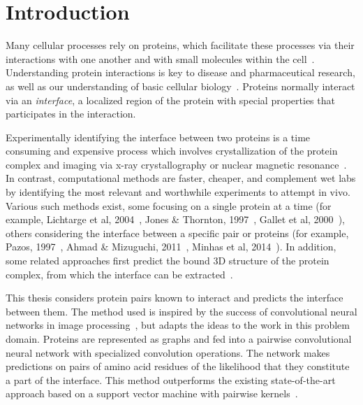 

\chapter{Introduction}
\label{chap:intro}

Many cellular processes rely on proteins, which facilitate these processes via their interactions with one another and with small molecules within the cell~\cite{scheeffink2003}.
Understanding protein interactions is key to disease and pharmaceutical research, as well as our understanding of basic cellular biology~\cite{fauman2003}\cite{altman2003}.
Proteins normally interact via an \textit{interface}, a localized region of the protein with special properties that participates in the interaction.

Experimentally identifying the interface between two proteins is a time consuming and expensive process which involves crystallization of the protein complex and imaging via x-ray crystallography or nuclear magnetic resonance~\cite{bijelic2017}\cite{ilarisavino2017}\cite{wang2017}.
In contrast, computational methods are faster, cheaper, and complement wet labs by identifying the most relevant and worthwhile experiments to attempt in vivo.
Various such methods exist, some focusing on a single protein at a time (for example, Lichtarge et al, 2004~\cite{lichtarge1996}, Jones \& Thornton, 1997~\cite{jones1997}, Gallet et al, 2000~\cite{gallet2000}), others considering the interface between a specific pair or proteins (for example, Pazos, 1997~\cite{pazos1997}, Ahmad \& Mizuguchi, 2011~\cite{ahmad2011}, Minhas et al, 2014~\cite{minhas2014}).
In addition, some related approaches first predict the bound 3D structure of the protein complex, from which the interface can be extracted~\cite{janin1995}\cite{chen2003}\cite{dominguez2003}.

This thesis considers protein pairs known to interact and predicts the interface between them.
The method used is inspired by the success of convolutional neural networks in image processing~\cite{gu2015}\cite{lecun2010}, but adapts the ideas to the work in this problem domain.
Proteins are represented as graphs and fed into a pairwise convolutional neural network with specialized convolution operations.
The network makes predictions on pairs of amino acid residues of the likelihood that they constitute a part of the interface. 
This method outperforms the existing state-of-the-art approach based on a support vector machine with pairwise kernels~\cite{minhas2014}.

